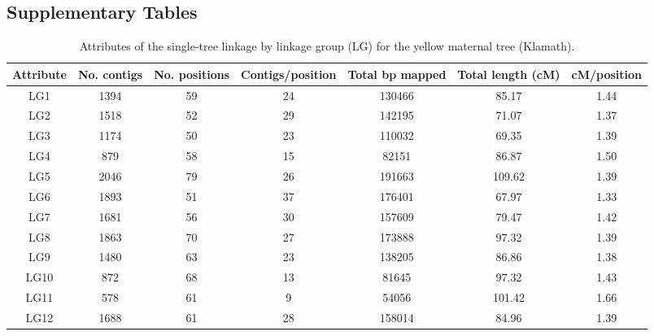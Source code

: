 \documentclass[smallextended]{svjour3}
\begin{document}
\begin{landscape}

\subsection*{Supplementary Tables}\label{ss:supp}

  
\begin{table}[ht]
\caption{Attributes of the single-tree linkage by linkage group (LG) for the yellow maternal tree (Klamath).}
\begin{tabular}{ccccccc}
\toprule
Attribute & No. contigs & No. positions & Contigs/position & Total bp mapped & Total length (cM) & cM/position \\
\midrule
LG1 & 1394 & 59 & 24 & 130466 & 85.17 & 1.44 \\
LG2 & 1518 & 52 & 29 & 142195 & 71.07 & 1.37 \\
LG3 & 1174 & 50 & 23 & 110032 & 69.35 & 1.39 \\
LG4 & 879 & 58 & 15 & 82151 & 86.87 & 1.50 \\
LG5 & 2046 & 79 & 26 & 191663 & 109.62 & 1.39 \\
LG6 & 1893 & 51 & 37 & 176401 & 67.97 & 1.33 \\
LG7 & 1681 & 56 & 30 & 157609 & 79.47 & 1.42 \\
LG8 & 1863 & 70 & 27 & 173888 & 97.32 & 1.39 \\
LG9 & 1480 & 63 & 23 & 138205 & 86.86 & 1.38 \\
LG10 & 872 & 68 & 13 & 81645 & 97.32 & 1.43 \\
LG11 & 578 & 61 & 9 & 54056 & 101.42 & 1.66 \\
LG12 & 1688 & 61 & 28 & 158014 & 84.96 & 1.39 \\
\bottomrule
\end{tabular} 
\label{t:label}
\end{table}
\end{landscape}
\end{document}
